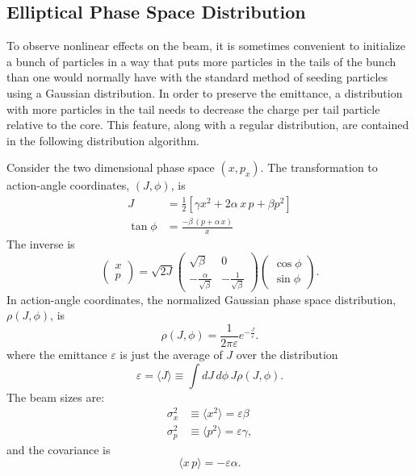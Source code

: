 \subsection{Elliptical Phase Space Distribution}
\label{s:ellipse.init}

To observe nonlinear effects on the beam, it is sometimes convenient to initialize a bunch of
particles in a way that puts more particles in the tails of the bunch than one would normally have
with the standard method of seeding particles using a Gaussian distribution. In order to preserve
the emittance, a distribution with more particles in the tail needs to decrease the charge per tail
particle relative to the core.  This feature, along with a regular distribution, are contained in
the following  distribution algorithm.

Consider the two dimensional phase space $(x, p_x)$. 
The transformation to action-angle coordinates,
$(J, \phi)$, is
\begin{align}
  J &= \frac{1}{2}[\gamma x^2 + 2 \alpha \, x \, p + \beta p^2] \\
  \tan\phi &= \frac{-\beta \, (p + \alpha \, x)}{x}
\end{align}
The inverse is
\begin{equation}
  \begin{pmatrix} 
    x \\ p
  \end{pmatrix} 
  = \sqrt{2J} 
  \begin{pmatrix} 
    \sqrt{\beta} & 0 \\ -\frac{\alpha}{\sqrt{\beta}} & 
    -\frac{1}{\sqrt{\beta}} 
  \end{pmatrix}
  \begin{pmatrix} 
    \cos\phi \\ 
    \sin\phi 
  \end{pmatrix}.
\end{equation}
In action-angle coordinates, the normalized Gaussian phase space 
distribution, $\rho(J, \phi)$, is
\begin{equation}
  \rho(J,\phi) = \frac{1}{2\pi\varepsilon} e^{-\frac{J}{\varepsilon}}.
  \label{eq:rho}
\end{equation}
where the emittance $\varepsilon$ is just the average of $J$ over the distribution
\begin{equation}
  \varepsilon = \langle J \rangle \equiv \int dJ \, d\phi \, J\rho(J,\phi).
  \label{eq:eps}
\end{equation}
The beam sizes are:
\begin{align}
  \sigma_{x}^2 & \equiv \langle x^2 \rangle = \varepsilon\beta  \\
  \sigma_{p}^2 & \equiv \langle p^2 \rangle = \varepsilon\gamma,
  \label{eq:rms}
\end{align}
and the covariance is
\begin{equation}
  \langle x \, p \rangle = -\varepsilon\alpha.
  \label{eq:corr}
\end{equation}

